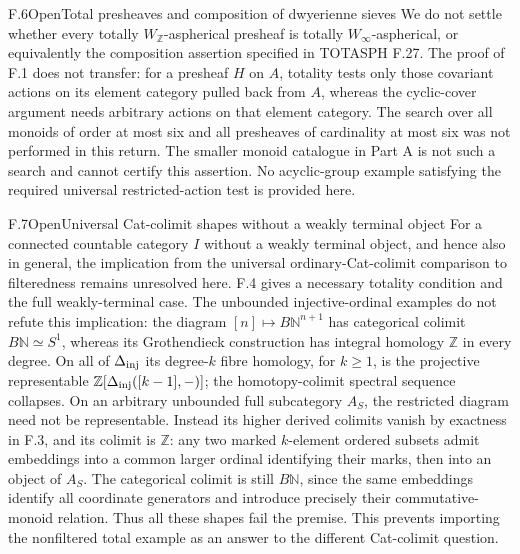 \begin{claim}{F.6}{Open}{Total presheaves and composition of dwyerienne sieves}
We do not settle whether every totally $W_{\mathbb Z}$-aspherical presheaf is totally $W_\infty$-aspherical, or equivalently the composition assertion specified in TOTASPH F.27. The proof of F.1 does not transfer: for a presheaf $H$ on $A$, totality tests only those covariant actions on its element category pulled back from $A$, whereas the cyclic-cover argument needs arbitrary actions on that element category. The search over all monoids of order at most six and all presheaves of cardinality at most six was not performed in this return. The smaller monoid catalogue in Part A is not such a search and cannot certify this assertion. No acyclic-group example satisfying the required universal restricted-action test is provided here.
\end{claim}

\begin{claim}{F.7}{Open}{Universal Cat-colimit shapes without a weakly terminal object}
For a connected countable category $I$ without a weakly terminal object, and hence also in general, the implication from the universal ordinary-Cat-colimit comparison to filteredness remains unresolved here. F.4 gives a necessary totality condition and the full weakly-terminal case. The unbounded injective-ordinal examples do not refute this implication: the diagram $[n]\mapsto B\mathbb N^{n+1}$ has categorical colimit $B\mathbb N\simeq S^1$, whereas its Grothendieck construction has integral homology $\mathbb Z$ in every degree. On all of $\Delta_{\rm inj}$ its degree-$k$ fibre homology, for $k\geq1$, is the projective representable $\mathbb Z[\Delta_{\rm inj}([k-1],-)]$; the homotopy-colimit spectral sequence collapses. On an arbitrary unbounded full subcategory $A_S$, the restricted diagram need not be representable. Instead its higher derived colimits vanish by exactness in F.3, and its colimit is $\mathbb Z$: any two marked $k$-element ordered subsets admit embeddings into a common larger ordinal identifying their marks, then into an object of $A_S$. The categorical colimit is still $B\mathbb N$, since the same embeddings identify all coordinate generators and introduce precisely their commutative-monoid relation. Thus all these shapes fail the premise. This prevents importing the nonfiltered total example as an answer to the different Cat-colimit question.
\end{claim}
